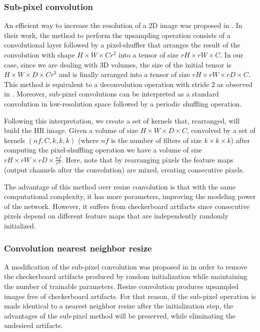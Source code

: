 \documentclass{article}
\begin{document}
\subsubsection{Sub-pixel convolution}
\label{sssec:subpixel}
An efficient way to increase the resolution of a 2D image was proposed in \cite{shi:efficsubpixel}. In their work, the method to perform the upsampling operation consists of a convolutional layer followed by a pixel-shuffler that arranges the result of the convolution with shape $ H \times W \times Cr^{2} $ into a tensor of size $ rH \times rW \times C $. In our case, since we are dealing with 3D volumes, the size of the initial tensor is $ H \times W \times D \times Cr^{3} $ and is finally arranged into a tensor of size $ rH \times rW \times rD \times C $. This method is equivalent to a deconvolution operation with stride 2 as observed in \cite{shi:deconvsubpix}. Moreover, sub-pixel convolutions can be interpreted as a standard convolution in low-resolution space followed by a periodic shuffling operation.

Following this interpretation, we create a set of kernels that, rearranged, will build the HR image. Given a volume of size $ H \times W \times D \times C $, convolved by a set of kernels $(nf, C, k, k, k)$ (where $nf$ is the number of filters of size $k \times k \times k$) after computing the pixel-shuffling operation we have a volume of size $ rH \times rW \times rD \times \frac{nf}{r^{3}} $. Here, note that by rearranging pixels the feature maps (output channels after the convolution) are mixed, creating consecutive pixels.

The advantage of this method over resize convolution is that with the same computational complexity, it has more parameters, improving the modeling power of the network. However, it suffers from checkerboard artifacts since consecutive pixels depend on different feature maps that are independently randomly initialized.



\subsubsection{Convolution nearest neighbor resize}
\label{sssec:free_subpixel}
A modification of the sub-pixel convolution was proposed in \cite{aitken:checkboardfree} in order to remove the  checkerboard artifacts produced by random initialization while maintaining the number of trainable parameters. Resize convolution produces upsampled images free of checkerboard artifacts. For that reason, if the sub-pixel operation is made identical to a nearest neighbor resize after the initialization step, the advantages of the sub-pixel method will be preserved, while eliminating the undesired artifacts.
\end{document}
